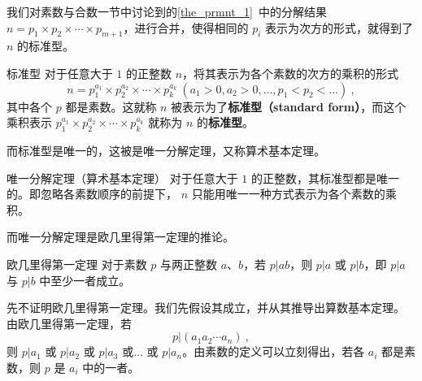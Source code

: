 
我们对素数与合数一节中讨论到的\autoref{the_prmnt_1}~中的分解结果 $n = p_1 \times p_2\times \cdots \times p_{m+1}$，进行合并，使得相同的 $p_i$ 表示为次方的形式，就得到了 $n$ 的标准型。
\begin{definition}{标准型}
对于任意大于 $1$ 的正整数 $n$，将其表示为各个素数的次方的乘积的形式
\begin{equation}
n = p_1^{a_1} \times p_2^{a_2} \times \cdots \times p_k^{a_k} ~ (a_1 > 0, a_2 > 0 , \dots, p_1 < p_2<\dots) ~,
\end{equation}
其中各个 $p$ 都是素数。这就称 $n$ 被表示为了\textbf{标准型（standard form）}，而这个乘积表示 $p_1^{a_1} \times p_2^{a_2} \times \cdots \times p_k^{a_k}$ 就称为 $n$ 的\textbf{标准型}。
\end{definition}

而标准型是唯一的，这被是唯一分解定理，又称算术基本定理。
\begin{theorem}{唯一分解定理（算术基本定理）}
对于任意大于 $1$ 的正整数，其标准型都是唯一的。即忽略各素数顺序的前提下， $n$ 只能用唯一一种方式表示为各个素数的乘积。
\end{theorem}

而唯一分解定理是欧几里得第一定理的推论。
\begin{theorem}{欧几里得第一定理}
对于素数 $p$ 与两正整数 $a$、$b$，若 $p|ab$，则 $p|a$ 或 $p|b$，即 $p|a$ 与 $p|b$ 中至少一者成立。
\end{theorem}

先不证明欧几里得第一定理。我们先假设其成立，并从其推导出算数基本定理。
由欧几里得第一定理，若
\begin{equation}
p | (a_1 a_2 \cdots a_n) ~,
\end{equation}
则 $p | a_1$ 或 $p | a_2$ 或 $p|a_3$ 或... 或 $p|a_n$。由素数的定义可以立刻得出，若各 $a_i$ 都是素数，则 $p$ 是 $a_i$ 中的一者。

